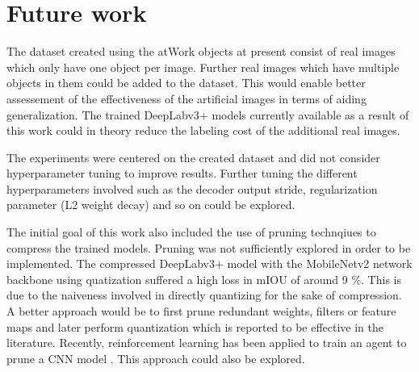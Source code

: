 \section{Future work}

The dataset created using the atWork objects at present consist of real images which only have one object per image. Further real images which have multiple objects in them could be added to the dataset. This would enable better assessement of the effectiveness of the artificial images in terms of aiding generalization. The trained DeepLabv3+ models currently available as a result of this work could in theory reduce the labeling cost of the additional real images. 

The experiments were centered on the created dataset and did not consider hyperparameter tuning to improve results. Further tuning the different hyperparameters involved such as the decoder output stride, regularization parameter (L2 weight decay) and so on could be explored.

The initial goal of this work also included the use of pruning technqiues to compress the trained models. Pruning was not sufficiently explored in order to be implemented. The compressed DeepLabv3+ model with the MobileNetv2 network backbone using quatization suffered a high loss in mIOU of around 9 \%. This is due to the naiveness involved in directly quantizing for the sake of compression. A better approach would be to first prune redundant weights, filters or feature maps and later perform quantization which is reported to be effective in the literature. Recently, reinforcement learning has been applied to train an agent to prune a CNN model \cite{DBLP:journals/corr/abs-1801-07365}. This approach could also be explored.

